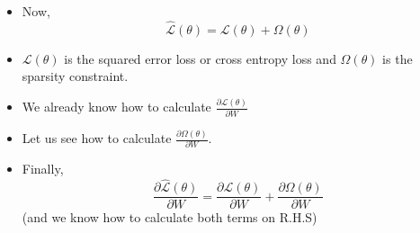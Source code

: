 \begin{frame}
\begin{columns}
    \small
    \begin{overlayarea}{\textwidth}{\textheight}
        \begin{itemize}\justifying
             \item Now,
                \[
                    \hat{\mathscr{L}}(\theta) = \mathscr{L}(\theta) + \Omega(\theta)
                \]
            \vspace{-0.5cm}
             \item $\mathscr{L}(\theta)$ is the squared error loss or cross entropy loss and $\Omega(\theta)$ is the      sparsity    constraint.
             \item We already know how to calculate $\frac{\partial\mathscr{L}(\theta)}{\partial W}$
             \item Let us see how to calculate $\frac{\partial{\Omega(\theta)}}{\partial{W}}$.
            \item Finally,
            \[
                \frac{\partial{\hat{\mathscr{L}}(\theta)}}{\partial{W}} = \frac{\partial{\mathscr{L}(\theta)}}{\partial{W}} + \frac{\partial{\Omega(\theta)}}{\partial{W}}
            \]
            (and we know how to calculate both terms on R.H.S)
        \end{itemize}
    \end{overlayarea}
  \end{columns}
\end{frame}



